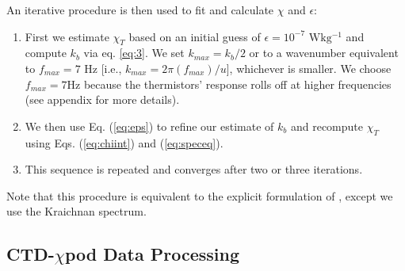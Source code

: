 \documentclass{ametsoc}
\begin{document}
An iterative procedure is then used to fit and calculate $\chi$ and $\epsilon$:

\begin{enumerate}
\item First we estimate $\chi_T$ based on an initial guess of $\epsilon=10^{-7}$ $\mathrm{Wkg^{-1}}$ and compute $k_b$ via eq. \ref{eq:3}. We set $k_{max} = k_b/2$ or to a wavenumber equivalent to $f_{max}=7$ Hz [i.e., $k_{max}= 2\pi(f_{max})/u$], whichever is smaller. We choose $f_{max}=7$Hz because the thermistors' response rolls off at higher frequencies (see appendix for more details).
\item We then use Eq. (\ref{eq:eps}) to refine our estimate of $k_b$ and recompute $\chi_T$ using Eqs. (\ref{eq:chiint}) and (\ref{eq:speceq}). 
\item This sequence is repeated and converges after two or three iterations.
\end{enumerate}
Note that this procedure is equivalent to the explicit formulation of \citep{alfordpinkel00b}, except we use the Kraichnan spectrum.

\subsection{CTD-$\chi$pod Data Processing}
\end{document}
